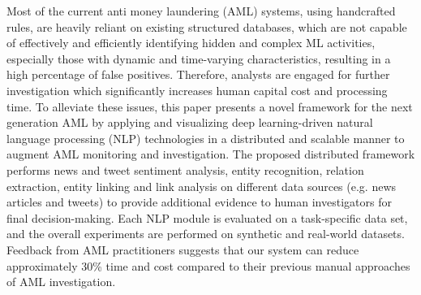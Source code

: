 Most of the current anti money laundering (AML) systems, using handcrafted rules, are heavily reliant on existing structured databases, which are not capable of effectively and efficiently identifying hidden and complex ML activities, especially those with dynamic and time-varying characteristics, resulting in a high percentage of false positives. Therefore, analysts are engaged for further investigation which significantly increases human capital cost and processing time. To alleviate these issues, this paper presents a novel framework for the next generation AML by applying and visualizing deep learning-driven natural language processing (NLP) technologies in a distributed and scalable manner to augment AML monitoring and investigation. The proposed distributed framework performs news and tweet sentiment analysis, entity recognition, relation extraction, entity linking and link analysis on different data sources (e.g. news articles and tweets) to provide additional evidence to human investigators for final decision-making. Each NLP module is evaluated on a task-specific data set, and the overall experiments are performed on synthetic and real-world datasets. Feedback from AML practitioners suggests that our system can reduce approximately 30\% time and cost compared to their previous manual approaches of AML investigation.

